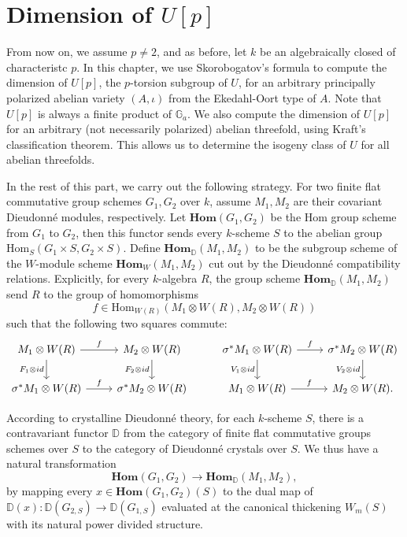 \documentclass[a4paper,12pt,twoside]{report}
\newcommand{\G}{\mathbb{G}}
\newcommand{\Hom}{\mathrm{Hom}}
\begin{document}
\chapter{Dimension of $U[p]$}\label{Chap4}

From now on, we assume $p\neq 2$, and as before, let $k$ be an algebraically closed of characteristc $p$. 
In this chapter, we use Skorobogatov's formula to compute the dimension of $U[p]$, the $p$-torsion subgroup of $U$,  
for an arbitrary principally polarized abelian variety $(A,\iota)$ from the Ekedahl-Oort type of $A$. 
Note that $U[p]$ is always a finite product of $\G_a$. 
We also compute the dimension of $U[p]$ for an arbitrary (not necessarily polarized) abelian threefold, 
using Kraft's classification theorem. 
This allows us to determine the isogeny class of $U$ for all abelian threefolds. 

In the rest of this part, we carry out the following strategy. 
For two finite flat commutative group schemes \(G_1,G_2\) over \(k\), 
assume \(M_1, M_2\) are their covariant Dieudonn\'e modules, respectively. 
Let \(\mathbf{Hom}(G_1,G_2)\) be the Hom group scheme from \(G_1\) to \(G_2\), 
then this functor sends every \(k\)-scheme \(S\) to the abelian group \(\Hom_{S}(G_1\times S,G_2\times S)\). 
Define \(\mathbf{Hom}_{\mathbb{D}}(M_1,M_2)\)  to be the subgroup scheme of the 
\(W\)-module scheme \(\mathbf{Hom}_W(M_1,M_2)\) cut out by the Dieudonn\'e compatibility relations. 
Explicitly, for every \(k\)-algebra \(R\), 
the group scheme \(\mathbf{Hom}_{\mathbb{D}}(M_1,M_2)\) send \(R\) to the group of homomorphisms 
\[f\in \Hom_{W(R)}(M_1\otimes W(R),M_2\otimes W(R))\] 
such that the following two squares commute: 
\[\begin{tikzcd}
	{M_1\otimes W(R)} & {M_2\otimes W(R)} & {\sigma^*M_1\otimes W(R)} & {\sigma^*M_2\otimes W(R)} \\
	{\sigma^*M_1\otimes W(R)} & {\sigma^*M_2\otimes W(R)} & {M_1\otimes W(R)} & {M_2\otimes W(R).}
	\arrow["f", from=1-1, to=1-2]
	\arrow["{F_1\otimes id}"', from=1-1, to=2-1]
	\arrow["{F_2\otimes id}"', from=1-2, to=2-2]
	\arrow["f", from=1-3, to=1-4]
	\arrow["{V_1\otimes id}"', from=1-3, to=2-3]
	\arrow["{V_2\otimes id}"', from=1-4, to=2-4]
	\arrow["f", from=2-1, to=2-2]
	\arrow["f", from=2-3, to=2-4]
\end{tikzcd}\]

According to crystalline Dieudonn\'e theory, for each \(k\)-scheme \(S\), 
there is a contravariant functor \(\mathbb{D}\) from the category of 
finite flat commutative groups schemes over \(S\)
to the category of Dieudonné crystals over \(S\). 
We thus have a natural transformation
\[\mathbf{Hom}(G_1,G_2)\rightarrow \mathbf{Hom}_{\mathbb{D}}(M_1,M_2),\]
by mapping every \(x\in \mathbf{Hom}(G_1,G_2)(S)\) to the dual map of 
\(\mathbb{D}(x):\mathbb{D}(G_{2,S})\rightarrow \mathbb{D}(G_{1,S})\) 
evaluated at the canonical thickening \(W_m(S)\) with its natural power divided structure. 
\end{document}
